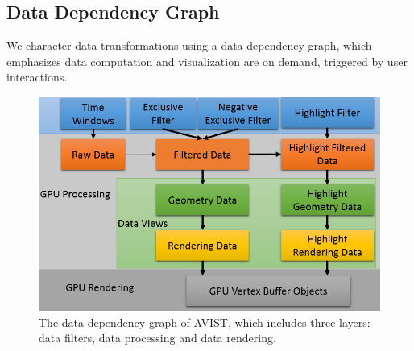 

\subsection{Data Dependency Graph}

We character data transformations using a data dependency graph, which emphasizes data computation and visualization are on demand, triggered by user interactions. 

\begin{figure}[htb]
	\centering
	\includegraphics[width=1.0\linewidth]{pic/graph.png}
	\parbox[t]{1.0\columnwidth}{\relax
	}
	\caption{\label{fig:datagraph} The data dependency graph of AVIST, which includes three layers: data filters, data processing and data rendering.}
\end{figure} 


